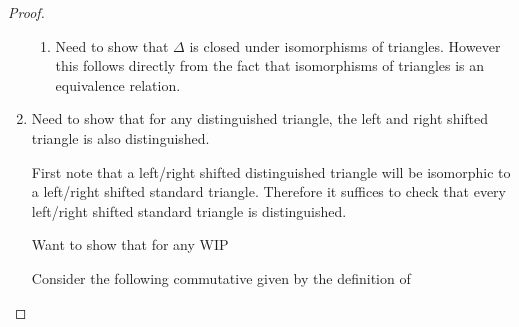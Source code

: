 \begin{proof}
\begin{enumerate}[label={(\bfseries T\arabic*)}]
{\begin{enumerate}
{\begin{center}
                    \end{center}
                    However, it is a known fact the pushout of an isomorphism is an isomorphism. And so \( \gamma \) is an isomorphism, which implies \( C_{\Id} \cong 0 \) in \( \Mc \) because all injective modules are projective in \( \Mc \).
                }
                \item {
                    Need to show that \( \Delta \) is closed under isomorphisms of triangles. However this follows directly from the fact that isomorphisms of triangles is an equivalence relation.
                }
            \end{enumerate}
        }
        \item {
            Need to show that for any distinguished triangle, the left and right shifted triangle is also distinguished.

            First note that a left/right shifted distinguished triangle will be isomorphic to a left/right shifted standard triangle. Therefore it suffices to check that every left/right shifted standard triangle is distinguished.

            Want to show that for any WIP

            Consider the following commutative given by the definition of 
            \begin{center}
            \end{center}
        }
    \end{enumerate}
\end{proof}